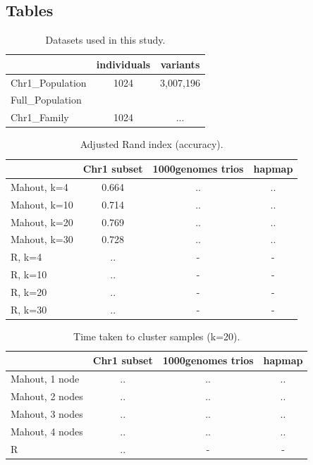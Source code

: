 \documentclass[twocolumn]{bmcart}%
\newcommand{\chrOnePop}{Chr1\_Population}
\newcommand{\FullPop}{Full\_Population}
\newcommand{\FullFam}{Chr1\_Family}
\begin{document}
\begin{backmatter}
\section*{Tables}
\begin{table}[h!]
\caption{Datasets used in this study.}
      \begin{tabular}{lcc}
        \hline
           & individuals  & variants  \\ \hline
        \chrOnePop & 1024 & 3,007,196 \\
        \FullPop\ &  & \\
        \FullFam\ & 1024 & ...\\
      \end{tabular}
      \label{datasets}
\end{table}

\begin{table}[h!]
\caption{Adjusted Rand index (accuracy).}
      \begin{tabular}{lccc}
        \hline
           & Chr1 subset & 1000genomes trios  & hapmap \\ \hline
        Mahout, k=4 & 0.664 & ..&..\\
        Mahout, k=10 & 0.714 & ..&..\\
        Mahout, k=20 & 0.769 & .. & ..\\ 
        Mahout, k=30 & 0.728 & .. & ..\\ 
        R, k=4 & .. & - & -\\
        R, k=10 & .. & - & -\\
        R, k=20 & .. & - & -\\ 
        R, k=30 & .. & - & -\\ \hline
      \end{tabular}
      \label{datasetsAcc}
\end{table}

\begin{table}[h!]
\caption{Time taken to cluster samples (k=20).}
      \begin{tabular}{lccc}
        \hline
           & Chr1 subset & 1000genomes trios  & hapmap \\ \hline
        Mahout, 1 node & .. & ..&..\\
        Mahout, 2 nodes & .. & ..&..\\
        Mahout, 3 nodes & .. & .. & ..\\ 
        Mahout, 4 nodes & .. & .. & ..\\ 
        R & .. & - & -\\ \hline
      \end{tabular}
      \label{datasetsTime}
\end{table}



\end{backmatter}
\end{document}

